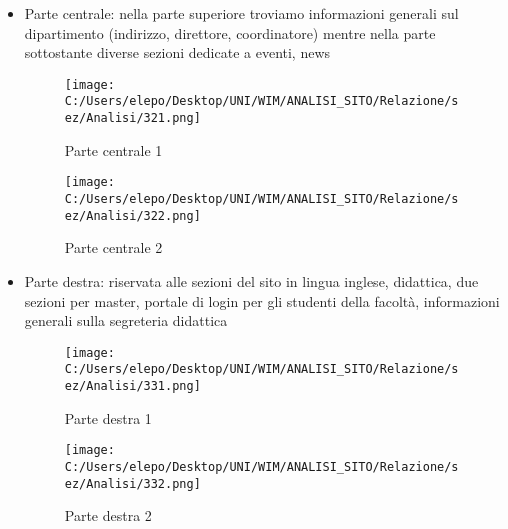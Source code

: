 \begin{itemize}
\begin{itemize}
		
		
		
		
		
		
		
		

\newpage
				\item Parte centrale: nella parte superiore troviamo informazioni generali sul dipartimento (indirizzo, direttore, coordinatore) mentre nella parte sottostante diverse sezioni dedicate a eventi, news
				\begin{center}
\begin{figure}[h!]
           \begin{center}
           \texttt{[image: C:/Users/elepo/Desktop/UNI/WIM/ANALISI\_SITO/Relazione/sez/Analisi/321.png]}
           \caption{Parte centrale 1}
           \end{center}
  \end{figure}
\end{center}
\begin{center}
\begin{figure}[h!]
           \begin{center}
           \texttt{[image: C:/Users/elepo/Desktop/UNI/WIM/ANALISI\_SITO/Relazione/sez/Analisi/322.png]}
           \caption{Parte centrale 2}
           \end{center}
  \end{figure}
\end{center}
\newpage
				\item Parte destra: riservata alle sezioni del sito in lingua inglese, didattica, due sezioni per master, portale di login per gli studenti della facoltà, informazioni generali sulla segreteria didattica
\begin{figure}[!htb]
   \begin{minipage}{0.48\textwidth}
     \centering
     \texttt{[image: C:/Users/elepo/Desktop/UNI/WIM/ANALISI\_SITO/Relazione/sez/Analisi/331.png]}
     \caption{Parte destra 1}
   \end{minipage}\hfill
   \begin{minipage}{0.48\textwidth}
     \centering
     \texttt{[image: C:/Users/elepo/Desktop/UNI/WIM/ANALISI\_SITO/Relazione/sez/Analisi/332.png]}
     \caption{Parte destra 2}
   \end{minipage}
\end{figure}					
				
				
				
				
			

\end{itemize}
\end{itemize}
